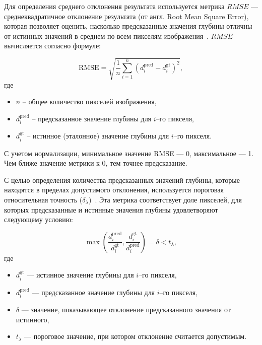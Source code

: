 Для определения среднего отклонения результата используется метрика $RMSE$ --- среднеквадратичное отклонение результата
(от англ. Root Mean Square Error), которая позволяет оценить,
насколько предсказанные значения глубины отличны от истинных значений в среднем по всем пикселям изображения~\cite{zhang2025review, istomin2024, shestopalov2024}.
$RMSE$ вычисляется согласно формуле:

\begin{equation}
    \text{RMSE} = \sqrt{\frac{1}{n} \sum_{i=1}^{n} (d_{i}^{\text{pred}} - d_{i}^{\text{gt}})^2},
\end{equation}
где
\begin{itemize}
    \item $n$ -- общее количество пикселей изображения,
    \item $d_{i}^{\text{pred}}$ -- предсказанное значение глубины для $i$--го пикселя,
    \item $d_{i}^{\text{gt}}$ -- истинное (эталонное) значение глубины для $i$--го пикселя.
\end{itemize}

С учетом нормализации, минимальное значение RMSE --- 0, максимальное --- 1.
Чем ближе значение метрики к 0, тем точнее предсказание.

С целью определения количества предсказанных значений глубины,
которые находятся в пределах допустимого отклонения, используется
пороговая относительная точность ($\delta_{\lambda}$)~\cite{zhang2025review, istomin2024, shestopalov2024}.
Эта метрика соответствует доле пикселей, для которых предсказанные и истинные значения глубины удовлетворяют следующему условию:

\begin{equation} 
    \max\left(\frac{d_{i}^{\text{pred}}}{d_{i}^{\text{gt}}}, \frac{d_{i}^{\text{gt}}}{d_{i}^{\text{pred}}}\right) = \delta < t_{\lambda},
\end{equation}
где
\begin{itemize}
    \item $d_{i}^{\text{gt}}$ --- истинное значение глубины для $i$--го пикселя,
    \item $d_{i}^{\text{pred}}$ --- предсказанное значение глубины для $i$--го пикселя,
    \item $\delta$ --- значение, показывающее отклонение предсказанного значения от истинного,
    \item $t_{\lambda}$ --- пороговое значение, при котором отклонение считается допустимым.
\end{itemize}


